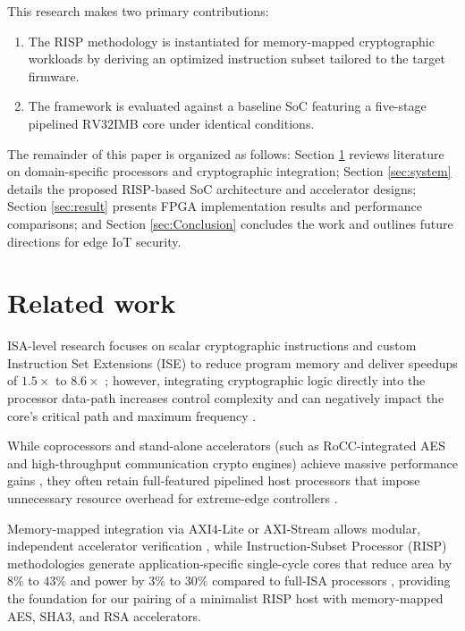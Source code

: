 This research makes two primary contributions:

\begin{enumerate}
    \item The RISP methodology is instantiated for memory-mapped cryptographic workloads by deriving an optimized instruction subset tailored to the target firmware.

    \item The framework is evaluated against a baseline SoC featuring a five-stage pipelined $\text{RV}32\text{I}$MB core under identical conditions.
\end{enumerate}

The remainder of this paper is organized as follows: Section \ref{sec:related} reviews literature on domain-specific processors and cryptographic integration; Section \ref{sec:system} details the proposed RISP-based SoC architecture and accelerator designs; Section \ref{sec:result} presents FPGA implementation results and performance comparisons; and Section \ref{sec:Conclusion} concludes the work and outlines future directions for edge IoT security.

\section{Related work}
\label{sec:related}

ISA-level research focuses on scalar cryptographic instructions and custom Instruction Set Extensions (ISE) to reduce program memory and deliver speedups of $1.5\times$ to $8.6\times$ \cite{cheng2023risc, marshall2021design, pham2026sha, pham2024secure, ignatius2024power, nicsanci2022symmetric}; however, integrating cryptographic logic directly into the processor data-path increases control complexity and can negatively impact the core's critical path and maximum frequency \cite{pham2024secure, ignatius2024power}.

While coprocessors and stand-alone accelerators (such as RoCC-integrated AES and high-throughput communication crypto engines) achieve massive performance gains \cite{gomes2022fac, pham2026sha, nannipieri2021risc, nicsanci2022symmetric, ma2023design, wang2021energy}, they often retain full-featured pipelined host processors that impose unnecessary resource overhead for extreme-edge controllers \cite{simola2024risc, cheng2023risc, ma2023design, gomes2022fac}.

Memory-mapped integration via $\text{AXI}4\text{-}\text{Lite}$ or AXI-Stream allows modular, independent accelerator verification \cite{axinte2025embedded, simola2024risc, nasahl2021hector}, while Instruction-Subset Processor (RISP) methodologies generate application-specific single-cycle cores that reduce area by $8\%$ to $43\%$ and power by $3\%$ to $30\%$ compared to full-ISA processors \cite{raissp2025}, providing the foundation for our pairing of a minimalist RISP host with memory-mapped AES, $\text{SHA}3$, and RSA accelerators.

